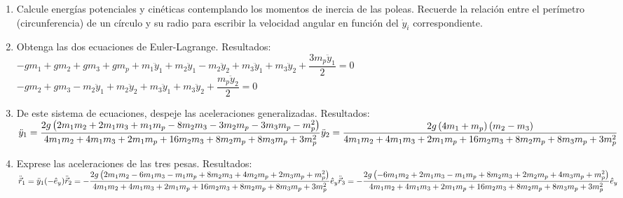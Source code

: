 \documentclass[11pt, spanish, a4paper, twoside]{article}
\begin{document}
\begin{enumerate}
		\begin{enumerate}
			\item Calcule energías potenciales y cinéticas contemplando los momentos de inercia de las poleas.
			Recuerde la relación entre el perímetro (circunferencia) de un círculo y su radio para escribir la velocidad angular en función del \(\dot{y}_i\) correspondiente.
			\item Obtenga las dos ecuaciones de Euler-Lagrange.
			Resultados:\\
			$
			- g m_{1} + g m_{2} + g m_{3} + g m_{p} + m_{1} \ddot{y}_{1} + m_{2} \ddot{y}_{1} - m_{2} \ddot{y}_{2} + m_{3} \ddot{y}_{1} + m_{3} \ddot{y}_{2} + \dfrac{3 m_{p} \ddot{y}_{1}}{2} = 0
			$
			\\[5pt]
			$
			- g m_{2} + g m_{3} - m_{2} \ddot{y}_{1} + m_{2} \ddot{y}_{2} + m_{3} \ddot{y}_{1} + m_{3} \ddot{y}_{2} + \dfrac{m_{p} \ddot{y}_{2}}{2} = 0
			$
			\item De este sistema de ecuaciones, despeje las aceleraciones generalizadas.
			Resultados:\\[5 pt]
			\(
				\ddot{y}_{1} = 
				\dfrac{2 g \left(2 m_{1} m_{2} + 2 m_{1} m_{3} + m_{1} m_{p} - 8 m_{2} m_{3} - 3 m_{2} m_{p} - 3 m_{3} m_{p} - m_{p}^{2}\right)}{4 m_{1} m_{2} + 4 m_{1} m_{3} + 2 m_{1} m_{p} + 16 m_{2} m_{3} + 8 m_{2} m_{p} + 8 m_{3} m_{p} + 3 m_{p}^{2}}\\[5 pt]
				\ddot{y}_{2} = 
				\dfrac{2 g \left(4 m_{1} + m_{p}\right) \left(m_{2} - m_{3}\right)}{4 m_{1} m_{2} + 4 m_{1} m_{3} + 2 m_{1} m_{p} + 16 m_{2} m_{3} + 8 m_{2} m_{p} + 8 m_{3} m_{p} + 3 m_{p}^{2}}
			\)
			\item Exprese las aceleraciones de las tres pesas. Resultados:\\[5 pt]
			\(
				\ddot{\vec{r}}_{1} = \ddot{y}_1 (- \hat{e}_y)\\[5 pt]
				\ddot{\vec{r}}_{2} = 
				- \dfrac{2 g \left(2 m_{1} m_{2} - 6 m_{1} m_{3} - m_{1} m_{p} + 8 m_{2} m_{3} + 4 m_{2} m_{p} + 2 m_{3} m_{p} + m_{p}^{2}\right)}{4 m_{1} m_{2} + 4 m_{1} m_{3} + 2 m_{1} m_{p} + 16 m_{2} m_{3} + 8 m_{2} m_{p} + 8 m_{3} m_{p} + 3 m_{p}^{2}} \hat{e}_y \\[5 pt]
				\ddot{\vec{r}}_{3} = 
				- \dfrac{2 g \left(- 6 m_{1} m_{2} + 2 m_{1} m_{3} - m_{1} m_{p} + 8 m_{2} m_{3} + 2 m_{2} m_{p} + 4 m_{3} m_{p} + m_{p}^{2}\right)}{4 m_{1} m_{2} + 4 m_{1} m_{3} + 2 m_{1} m_{p} + 16 m_{2} m_{3} + 8 m_{2} m_{p} + 8 m_{3} m_{p} + 3 m_{p}^{2}} \hat{e}_y
				\) 
		\end{enumerate}

\end{enumerate}
\end{document}
